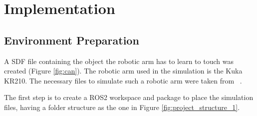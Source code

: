 \documentclass[12pt,oneside]{article}
\begin{document}

%
\section{Implementation}\label{sec:umsetzung}
\subsection{Environment Preparation}
A SDF file containing the object the robotic arm has to learn to touch was created (Figure \ref{fig:can}).
The robotic arm used in the simulation is the Kuka KR210. The necessary files to simulate such a robotic arm were taken from ~\cite{RoboND-Kinematics-Project}. 

The first step is to create a ROS2 workspace and package to place the simulation files, having a folder structure as the one in Figure \ref{fig:project_structure_1}.
\end{document}
